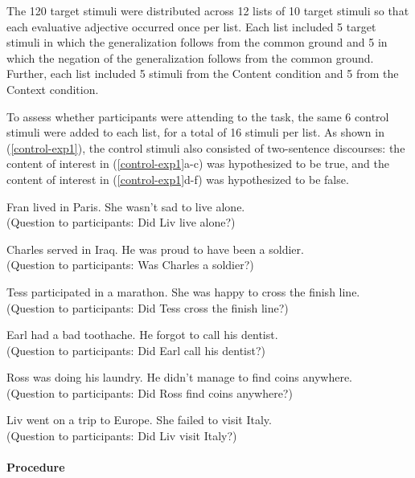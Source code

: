 \documentclass[11pt,fleqn]{article}
\newcommand{\6}{\mbox{$[\hspace*{-.6mm}[$}}
\newcommand{\9}{\mbox{$]\hspace*{-.6mm}]$}}
\begin{document}
The 120 target stimuli were distributed across 12 lists of 10 target stimuli so that each evaluative adjective occurred once per list. Each list included 5 target stimuli in which the generalization follows from the common ground and 5 in which the negation of the generalization follows from the common ground. Further, each list included 5 stimuli from the Content condition and 5 from the Context condition.

To assess whether participants were attending to the task, the same 6 control stimuli were added to each list, for a total of 16 stimuli per list. As shown in (\ref{control-exp1}), the control stimuli also consisted of two-sentence discourses: the content of interest in (\ref{control-exp1}a-c) was hypothesized to be true, and the content of interest in (\ref{control-exp1}d-f) was hypothesized to be false.

\begin{exe}
\ex\label{control-exp1} 

\begin{xlist}

\ex Fran lived in Paris. She wasn't sad to live alone. \\ (Question to participants: Did Liv live alone?)

\ex Charles served in Iraq. He was proud to have been a soldier. \\ (Question to participants: Was Charles a soldier?)

\ex Tess participated in a marathon. She was happy to cross the finish line. \\ (Question to participants: Did Tess cross the finish line?)


\ex Earl had a bad toothache. He forgot to
call his dentist. \\ (Question to participants: Did Earl call his
dentist?)

\ex Ross was doing his laundry. He didn't manage to find coins anywhere. \\ (Question to participants: Did Ross find coins anywhere?)

\ex Liv went on a trip to Europe. She failed to visit Italy. \\
(Question to participants: Did Liv visit Italy?)

\end{xlist}
\end{exe}

\paragraph{Procedure}
\end{document}
